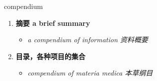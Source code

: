 
\begin{frame}
{\huge compendium}
\begin{center}
\begin{enumerate}\Large
  \item \textbf{摘要 a brief summary}
  \begin{itemize}
    \item \em{\Large{a compendium of information 资料概要}}
  \end{itemize}
  \item \textbf{目录，各种项目的集合}
  \begin{itemize}
    \item \em{\Large{compendium of materia medica 本草纲目}}
  \end{itemize}
\end{enumerate}
\end{center}
\end{frame}
